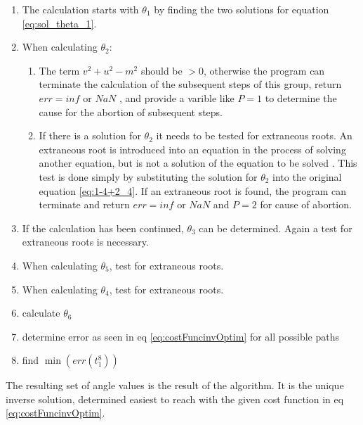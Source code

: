 \begin{enumerate}
	\item The calculation starts with $\theta_1$ by finding the two solutions for equation \ref{eq:sol_theta_1}.
	\item When calculating $\theta_2$:
	\begin{enumerate}
		\item  The term $ v^2 + u^2 - m^2 $ should be $ > 0$, otherwise the program can terminate the calculation of the subsequent steps of this group, return $err = inf $ or $NaN $ , and provide a varible like $P=1$ to determine the cause for the abortion of subsequent steps.
		\item If there is a solution for $\theta_2$ it needs to be tested for extraneous roots. An extraneous root is  introduced into an equation in the process of solving another equation, but is not a solution of the equation to be solved \cite{extraneousroot}. This test is done simply by substituting the solution for $\theta_2$ into the original equation \ref{eq:1-4+2_4}. If an extraneous root is found, the program can terminate and return $err = inf$ or $ NaN$  and $P=2$ for cause of abortion. 
	\end{enumerate}
	\item If the calculation has been continued, $\theta_3$ can be determined. Again a test for extraneous roots is necessary.
	\item When calculating $\theta_5$, test for extraneous roots.
	\item When calculating $\theta_4$, test for extraneous roots.
	\item calculate $\theta_6$
	\item determine error as seen in eq \ref{eq:costFuncinvOptim} for all possible paths
	\item find $\min ( err(t_1^8))$ 
\end{enumerate}

The resulting set of angle values is the result of the algorithm. It is the unique inverse solution, determined easiest to reach with the given cost function in eq \ref{eq:costFuncinvOptim}. 






